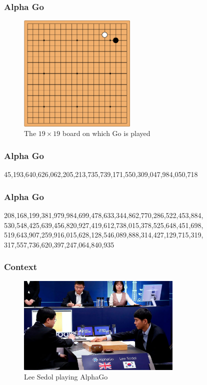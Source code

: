 \documentclass{beamer}
\begin{document}
\begin{frame} %
\frametitle{Alpha Go}
\begin{figure}
	\centering
	\includegraphics[width=0.5\textwidth]{images/go.png}
	\caption{The $19\times19$ board on which Go is played}
	\label{go}
\end{figure}
\end{frame}

\begin{frame} %
\frametitle{Alpha Go}
45,193,640,626,062,205,213,735,739,171,550,309,047,984,050,718 \cite{chesspositions}
\end{frame}

\begin{frame} %
\frametitle{Alpha Go}
208,168,199,381,979,984,699,478,633,344,862,770,286,522,453,884,\\
530,548,425,639,456,820,927,419,612,738,015,378,525,648,451,698,\\
519,643,907,259,916,015,628,128,546,089,888,314,427,129,715,319,\\
317,557,736,620,397,247,064,840,935 \cite{gopositions}
\end{frame}

\begin{frame} %
\frametitle{Context}
\begin{figure}
	\centering
	\includegraphics[width=0.7\textwidth]{images/alphagomatch.jpg}
	\caption{Lee Sedol playing AlphaGo}
	\label{alphagomatch}
\end{figure}
\end{frame}
\end{document}
